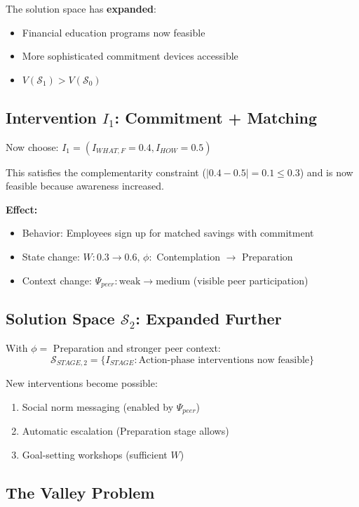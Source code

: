 The solution space has \textbf{expanded}:
\begin{itemize}
    \item Financial education programs now feasible
    \item More sophisticated commitment devices accessible
    \item $V(\mathcal{S}_1) > V(\mathcal{S}_0)$
\end{itemize}

\subsection{Intervention $I_1$: Commitment + Matching}

Now choose: $I_1 = (I_{WHAT,F} = 0.4, I_{HOW} = 0.5)$

This satisfies the complementarity constraint ($|0.4 - 0.5| = 0.1 \leq 0.3$) and is now feasible because awareness increased.

\textbf{Effect:}
\begin{itemize}
    \item Behavior: Employees sign up for matched savings with commitment
    \item State change: $W: 0.3 \to 0.6$, $\phi: $ Contemplation $\to$ Preparation
    \item Context change: $\Psi_{peer}: \text{weak} \to \text{medium}$ (visible peer participation)
\end{itemize}

\subsection{Solution Space $\mathcal{S}_2$: Expanded Further}

With $\phi = $ Preparation and stronger peer context:
\begin{equation}
\mathcal{S}_{STAGE,2} = \{I_{STAGE} : \text{Action-phase interventions now feasible}\}
\end{equation}

New interventions become possible:
\begin{enumerate}
    \item Social norm messaging (enabled by $\Psi_{peer}$)
    \item Automatic escalation (Preparation stage allows)
    \item Goal-setting workshops (sufficient $W$)
\end{enumerate}

\subsection{The Valley Problem}

